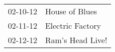\begin{supertabular}{p{0.07\textwidth}p{0.23\textwidth}}
 02-10-12 &    House of Blues \\
 02-11-12 &  Electric Factory \\
 02-12-12 &  Ram's Head Live! \\
\end{supertabular}
